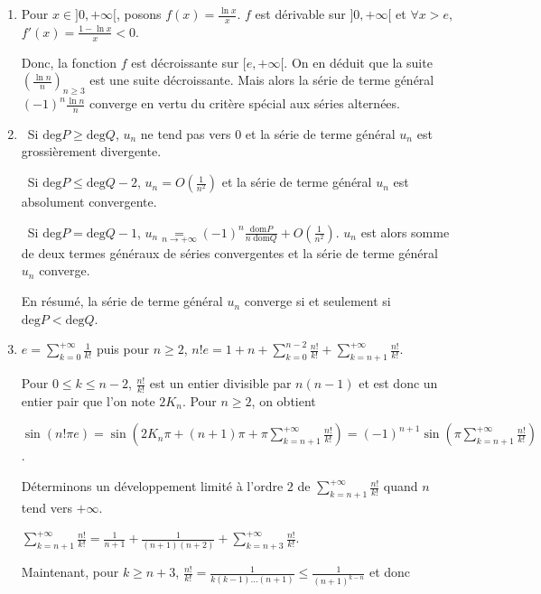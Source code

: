 \documentclass[11pt,a4paper]{article}
\begin{document}
\begin{enumerate}
\item  Pour $x\in]0,+\infty[$, posons $f(x)=\frac{\ln x}{x}$. $f$ est dérivable sur $]0,+\infty[$ et $\forall x>e$, $f'(x)=\frac{1-\ln x}{x}< 0$.

Donc, la fonction $f$ est décroissante sur $[e,+\infty[$. On en déduit que la suite $\left(\frac{\ln n}{n}\right)_{n\geqslant3}$ est une suite décroissante. Mais alors la série de terme général $(-1)^n\frac{\ln n}{n}$ converge en vertu du critère spécial aux séries alternées.

\item  \textbullet~Si $\text{deg}P\geqslant\text{deg}Q$, $u_n$ ne tend pas vers $0$ et la série de terme général $u_n$ est grossièrement divergente.

\textbullet~Si $\text{deg}P\leqslant\text{deg}Q - 2$, $u_n=O\left(\frac{1}{n^2}\right)$ et la série de terme général $u_n$ est absolument convergente.

\textbullet~Si $\text{deg}P =\text{deg}Q - 1$, $u_n\underset{n\rightarrow+\infty}{=}(-1)^n\frac{\text{dom}P}{n\;\text{dom}Q}+O\left(\frac{1}{n^2}\right)$. $u_n$ est alors somme de deux termes généraux de séries convergentes et la série de terme général $u_n$ converge.

En résumé, la série de terme général $u_n$ converge si et seulement si $\text{deg}P <\text{deg}Q$.

\item  $e=\sum_{k=0}^{+\infty}\frac{1}{k!}$  puis pour $n\geqslant2$, $n!e=1+ n+\sum_{k=0}^{n-2}\frac{n!}{k!}+\sum_{k=n+1}^{+\infty}\frac{n!}{k!}$.

Pour $0\leqslant k\leqslant n-2$, $\frac{n!}{k!}$ est un entier divisible par $n(n-1)$ et est donc un entier pair que l'on note $2K_n$. Pour $n\geqslant2$, on obtient

\begin{center}
$\sin(n!\pi e)=\sin\left(2K_n\pi+(n+1)\pi+\pi\sum_{k=n+1}^{+\infty}\frac{n!}{k!}\right)=(-1)^{n+1}\sin\left(\pi\sum_{k=n+1}^{+\infty}\frac{n!}{k!}\right)$.
\end{center}

Déterminons un développement limité à l'ordre $2$ de $\sum_{k=n+1}^{+\infty}\frac{n!}{k!}$ quand $n$ tend vers $+\infty$.

\begin{center}
$\sum_{k=n+1}^{+\infty}\frac{n!}{k!}=\frac{1}{n+1}+\frac{1}{(n+1)(n+2)}+\sum_{k=n+3}^{+\infty}\frac{n!}{k!}$.
\end{center}

Maintenant, pour $k\geqslant n+3$, $\frac{n!}{k!}=\frac{1}{k(k-1)\ldots(n+1)}\leqslant\frac{1}{(n+1)^{k-n}}$ et donc


\end{enumerate}
\end{document}
